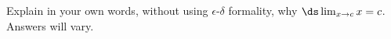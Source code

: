 {Explain in your own words, without using $\epsilon$-$\delta$ formality, why $\ds \lim_{x\to c} x = c$.}
{Answers will vary.
}
